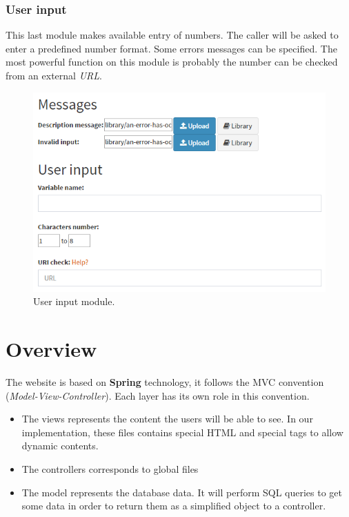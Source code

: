 \subsubsection{User input}
This last module makes available entry of numbers. The caller will be asked to enter a predefined number format. Some errors messages can be specified. The most powerful function on this module is probably the number can be checked from an external \textit{URL}. 

\begin{figure}[H]
  \caption{User input module.}
  \centering
    \includegraphics[width=1\textwidth]{img/userinput.png}
\end{figure}



\section{Overview}

The website is based on \textbf{Spring} technology,  it follows the MVC convention (\textit{Model-View-Controller}). Each layer has its own role in this convention.


\begin{itemize}  
\item The views represents the content the users will be able to see. In our implementation, these files contains special HTML and special tags to allow dynamic contents. 
\item The controllers corresponds to global files 
\item The model represents the database data. It will perform SQL queries to get some data in order to return them as a simplified object to a controller.
\end{itemize}  

